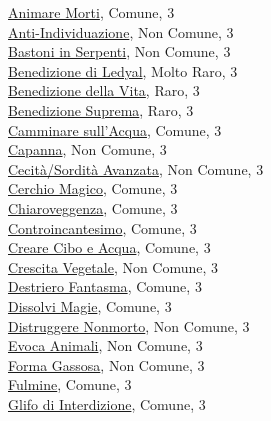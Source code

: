 \begin{multicols}{3}
{{\hyperlink{Animare Morti}{Animare Morti}, Comune, 3\\
\hyperlink{Anti-Individuazione}{Anti-Individuazione}, Non Comune, 3\\
\hyperlink{Bastoni in Serpenti}{Bastoni in Serpenti}, Non Comune, 3\\
\hyperlink{Benedizione di Ledyal}{Benedizione di Ledyal}, Molto Raro, 3\\
\hyperlink{Benedizione della Vita}{Benedizione della Vita}, Raro, 3\\
\hyperlink{Benedizione Suprema}{Benedizione Suprema}, Raro, 3\\
\hyperlink{Camminare sull'Acqua}{Camminare sull'Acqua}, Comune, 3\\
\hyperlink{Capanna}{Capanna}, Non Comune, 3\\
\hyperlink{Cecità/Sordità Avanzata}{Cecità/Sordità Avanzata}, Non Comune, 3\\
\hyperlink{Cerchio Magico}{Cerchio Magico}, Comune, 3\\
\hyperlink{Chiaroveggenza}{Chiaroveggenza}, Comune, 3\\
\hyperlink{Controincantesimo}{Controincantesimo}, Comune, 3\\
\hyperlink{Creare Cibo e Acqua}{Creare Cibo e Acqua}, Comune, 3\\
\hyperlink{Crescita Vegetale}{Crescita Vegetale}, Non Comune, 3\\
\hyperlink{Destriero Fantasma}{Destriero Fantasma}, Comune, 3\\
\hyperlink{Dissolvi Magie}{Dissolvi Magie}, Comune, 3\\
\hyperlink{Distruggere nonmorto}{Distruggere Nonmorto}, Non Comune, 3\\
\hyperlink{Evoca Animali}{Evoca Animali}, Non Comune, 3\\
\hyperlink{Forma Gassosa}{Forma Gassosa}, Non Comune, 3\\
\hyperlink{Fulmine}{Fulmine}, Comune, 3\\
\hyperlink{Glifo di Interdizione}{Glifo di Interdizione}, Comune, 3\\
}}
\end{multicols}
